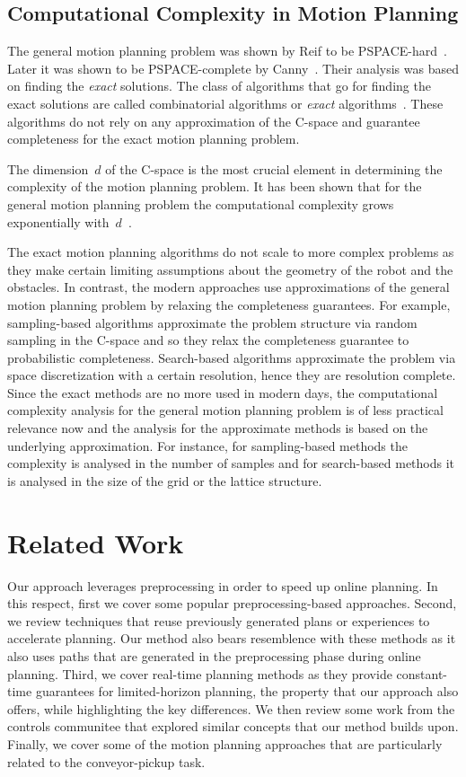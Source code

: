 \documentclass[a4paper]{report}
\begin{document}
\section{Computational Complexity in Motion Planning}
The general motion planning problem was shown by Reif to be PSPACE-hard~\cite{reif1979complexity}. Later it was shown to be PSPACE-complete by Canny~\cite{canny1988complexity}. Their analysis was based on finding the \emph{exact} solutions. The class of algorithms that go for finding the exact solutions are called combinatorial algorithms or \emph{exact} algorithms~\cite{lavalle2006planning}. These algorithms do not rely on any approximation of the C-space and guarantee completeness for the exact motion planning problem.

The dimension~$d$ of the C-space is the most crucial element in determining the complexity of the motion planning problem. It has been shown that for the general motion planning problem the computational complexity grows exponentially with~$d$~\cite{chazelle1991singly}.

The exact motion planning algorithms do not scale to more complex problems as they make certain limiting assumptions about the geometry of the robot and the obstacles. In contrast, the modern approaches use approximations of the general motion planning problem by relaxing the completeness guarantees. For example, sampling-based algorithms approximate the problem structure via random sampling in the C-space and so they relax the completeness guarantee to probabilistic completeness. Search-based algorithms approximate the problem via space discretization with a certain resolution, hence they are resolution complete.
Since the exact methods are no more used in modern days, the computational complexity analysis for the general motion planning problem is of less practical relevance now and the analysis for the approximate methods is based on the underlying approximation. For instance, for sampling-based methods the complexity is analysed in the number of samples and for search-based methods it is analysed in the size of the grid or the lattice structure.


\newpage
\chapter{Related Work}
\label{sec:rel}
Our approach leverages preprocessing in order to speed up online planning. In this respect, first we cover some popular preprocessing-based approaches. Second, we review techniques that reuse previously generated plans or experiences to accelerate planning. Our method also bears resemblence with these methods as it also uses paths that are generated in the preprocessing phase during online planning. Third, we cover real-time planning methods as they provide constant-time guarantees for limited-horizon planning, the property that our approach also offers, while highlighting the key differences. We then review some work from the controls communitee that explored similar concepts that our method builds upon. Finally, we cover some of the motion planning approaches that are particularly related to the conveyor-pickup task.
\end{document}
